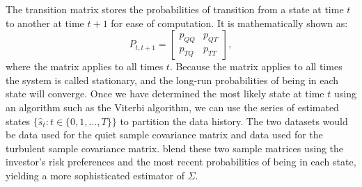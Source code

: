 \documentclass[a4paper,11pt,nocenter,bold,noupper,headcount]{mythesis}
\theoremstyle{plain}
\theoremstyle{definition}
\begin{document}
The transition matrix stores the probabilities of transition from a state at time $t$ to another at time $t + 1$ for ease of computation. It is mathematically shown as:
$$P_{t, t + 1} = \begin{bmatrix} 
p_{QQ} & p_{QT} \\
p_{TQ} & p_{TT}  
\end{bmatrix},$$
where the matrix applies to all times $t$. Because the matrix applies to all times the system is called stationary, and the long-run probabilities of being in each state will converge. Once we have determined the most likely state at time $t$ using an algorithm such as the Viterbi algorithm,  we can use the series of estimated states \newline $\{\hat{s}_t: t \in \{0, 1, ..., T\}\}$ to partition the data history. The two datasets would be data used for the quiet sample covariance matrix and data used for the turbulent sample covariance matrix. \cite{FD18} blend these two sample matrices using the investor's risk preferences and the most recent probabilities of being in each state, yielding a more sophisticated estimator of $\Sigma$.
\end{document}
